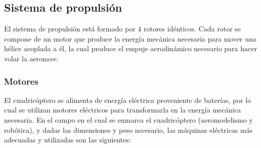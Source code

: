 \documentclass[12pt,twoside]{article}
\begin{document}
			
			
		\subsection{Sistema de propulsión}\label{subsec:propulsion}
		El sistema de propulsión está formado por 4 rotores idénticos. Cada rotor se compone de un motor que produce la energía mecánica necesaria para mover una hélice acoplada a él, la cual produce el empuje aerodinámico necesario para hacer volar la aeronave.
			\subsubsection{Motores}\label{subsubsec:motores}
			El cuadricóptero se alimenta de energía eléctrica proveniente de baterías, por lo cual se utilizan motores eléctricos para transformarla en la energía mecánica necesaria.
En el campo en el cual se enmarca el cuadricóptero (aeromodelismo y robótica), y dadas las dimensiones y peso necesario, las máquinas eléctricas más adecuadas y utilizadas son las siguientes:
\end{document}
